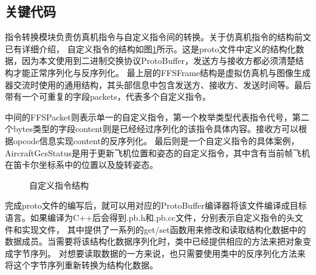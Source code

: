 \subsection{关键代码}
指令转换模块负责仿真机指令与自定义指令间的转换。关于仿真机指令的结构前文已有详细介绍，
自定义指令的结构如图\ref{protostruct}所示。这是proto文件中定义的结构化数据，因为本文使用到二进制交换协议ProtoBuffer，发送方与接收方都必须清楚结构才能正常序列化与反序列化。
最上层的FFSFrame结构是虚拟仿真机与图像生成器交流时使用的通用结构，其头部信息中包含发送方、接收方、发送时间等。最后带有一个可重复的字段packets，代表多个自定义指令。
\par
中间的FFSPacket则表示单一的自定义指令，第一个枚举类型代表指令代号，第二个bytes类型的字段content则是已经经过序列化的该指令具体内容。接收方可以根据opcode信息实现content的反序列化。
最后则是一个自定义指令的具体案例，AircraftGcsStatus是用于更新飞机位置和姿态的自定义指令，其中含有当前帧飞机在笛卡尔坐标系中的位置以及旋转姿态。
\begin{figure}[h!]
    \begin{center}
        
        \caption{自定义指令结构}
        \label{protostruct}
    \end{center}
\end{figure}
\par
完成proto文件的编写后，就可以用对应的ProtoBuffer编译器将该文件编译成目标语言。如果编译为C++后会得到.pb.h和.pb.cc文件，分别表示自定义指令的头文件和实现文件，
其中提供了一系列的get/set函数用来修改和读取结构化数据中的数据成员。当需要将该结构化数据序列化时，类中已经提供相应的方法来把对象变成字节序列。
对想要读取数据的一方来说，也只需要使用类中的反序列化方法来将这个字节序列重新转换为结构化数据。

